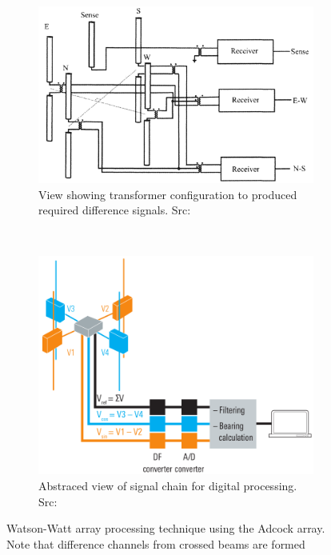 \begin{figure}
  \centering
  \begin{subfigure}[b]{0.48\textwidth}
    \includegraphics[width=\textwidth]{./img/lit_review/watson-watt-processing-analogue}
    \caption{View showing transformer configuration to produced required difference signals. Src: \cite{poisel2008introduction}}
  \end{subfigure}
  ~
  \begin{subfigure}[b]{0.48\textwidth}
    \includegraphics[width=\textwidth]{./img/lit_review/watson-watt-processing-digital}
    \caption{Abstraced view of signal chain for digital processing. Src: \cite{rhode2000introtodf}}
  \end{subfigure}
  \caption{Watson-Watt array processing technique using the Adcock array. Note that difference channels from crossed beams are formed}
  \label{fig:watson-watt}
\end{figure}

